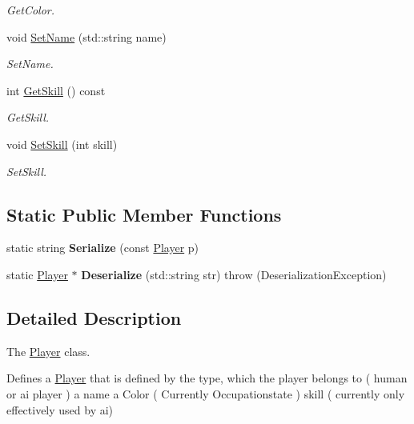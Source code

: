 \begin{DoxyCompactItemize}
\begin{DoxyCompactList}\small\item\em Get\-Color. \end{DoxyCompactList}\item 
void \hyperlink{classPlayer_ac6727206628d233b9094c8e80f777c1d}{Set\-Name} (std\-::string name)
\begin{DoxyCompactList}\small\item\em Set\-Name. \end{DoxyCompactList}\item 
int \hyperlink{classPlayer_a9d8cedd46573b958fe6febbf89d07322}{Get\-Skill} () const 
\begin{DoxyCompactList}\small\item\em Get\-Skill. \end{DoxyCompactList}\item 
void \hyperlink{classPlayer_a432304cacd50b399038ea787d65464cc}{Set\-Skill} (int skill)
\begin{DoxyCompactList}\small\item\em Set\-Skill. \end{DoxyCompactList}\end{DoxyCompactItemize}
\subsection*{Static Public Member Functions}
\begin{DoxyCompactItemize}
\item 
\hypertarget{classPlayer_a4847e9d725d82c06e3cad28a12deadb4}{static string {\bfseries Serialize} (const \hyperlink{classPlayer}{Player} p)}\label{classPlayer_a4847e9d725d82c06e3cad28a12deadb4}

\item 
\hypertarget{classPlayer_a5db86c30afa559aa2cf7a95e661b262c}{static \hyperlink{classPlayer}{Player} $\ast$ {\bfseries Deserialize} (std\-::string str)  throw (\-Deserialization\-Exception)}\label{classPlayer_a5db86c30afa559aa2cf7a95e661b262c}

\end{DoxyCompactItemize}


\subsection{Detailed Description}
The \hyperlink{classPlayer}{Player} class. 

Defines a \hyperlink{classPlayer}{Player} that is defined by the type, which the player belongs to ( human or ai player ) a name a Color ( Currently Occupationstate ) skill ( currently only effectively used by ai)

